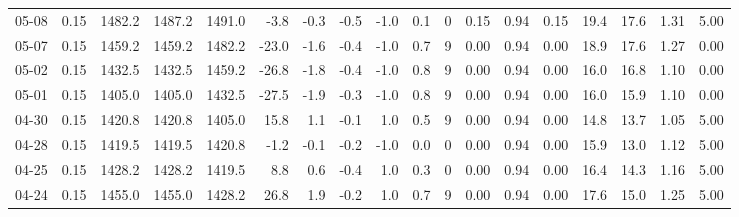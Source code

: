 \begin{threeparttable}
{\begin{tabular}{lrrrrrrrrrrrrrrrrr}
  05-08 &     0.15 & 1482.2 & 1487.2 & 1491.0 &       -3.8 &           -0.3 &                      -0.5 &                     -1.0 &                 0.1 &              0 &       0.15 &      0.94 &           0.15 &             19.4 &                17.6 &            1.31 &                   5.00 \\
  05-07 &     0.15 & 1459.2 & 1459.2 & 1482.2 &      -23.0 &           -1.6 &                      -0.4 &                     -1.0 &                 0.7 &              9 &       0.00 &      0.94 &           0.00 &             18.9 &                17.6 &            1.27 &                   0.00 \\
  05-02 &     0.15 & 1432.5 & 1432.5 & 1459.2 &      -26.8 &           -1.8 &                      -0.4 &                     -1.0 &                 0.8 &              9 &       0.00 &      0.94 &           0.00 &             16.0 &                16.8 &            1.10 &                   0.00 \\
  05-01 &     0.15 & 1405.0 & 1405.0 & 1432.5 &      -27.5 &           -1.9 &                      -0.3 &                     -1.0 &                 0.8 &              9 &       0.00 &      0.94 &           0.00 &             16.0 &                15.9 &            1.10 &                   0.00 \\
  04-30 &     0.15 & 1420.8 & 1420.8 & 1405.0 &       15.8 &            1.1 &                      -0.1 &                      1.0 &                 0.5 &              9 &       0.00 &      0.94 &           0.00 &             14.8 &                13.7 &            1.05 &                   5.00 \\
  04-28 &     0.15 & 1419.5 & 1419.5 & 1420.8 &       -1.2 &           -0.1 &                      -0.2 &                     -1.0 &                 0.0 &              0 &       0.00 &      0.94 &           0.00 &             15.9 &                13.0 &            1.12 &                   5.00 \\
  04-25 &     0.15 & 1428.2 & 1428.2 & 1419.5 &        8.8 &            0.6 &                      -0.4 &                      1.0 &                 0.3 &              0 &       0.00 &      0.94 &           0.00 &             16.4 &                14.3 &            1.16 &                   5.00 \\
  04-24 &     0.15 & 1455.0 & 1455.0 & 1428.2 &       26.8 &            1.9 &                      -0.2 &                      1.0 &                 0.7 &              9 &       0.00 &      0.94 &           0.00 &             17.6 &                15.0 &            1.25 &                   5.00 \\

\end{tabular}}
\end{threeparttable}
